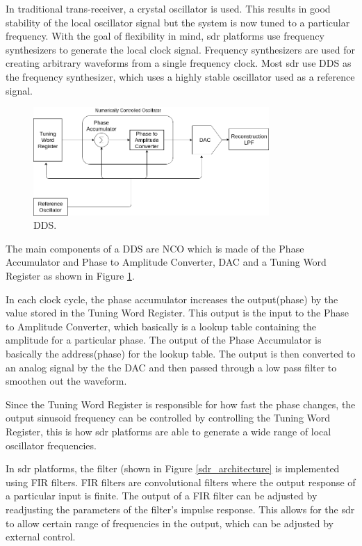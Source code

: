 \begin{itemize}
In traditional trans-receiver, a crystal oscillator is used.
This results in good stability of the local oscillator signal but the system is now tuned to a particular frequency.
With the goal of flexibility in mind, \ac{sdr} platforms use frequency synthesizers to generate the local clock signal.
Frequency synthesizers are used for creating arbitrary waveforms from a single frequency clock.
Most \ac{sdr} use \ac{DDS} as the frequency synthesizer, which uses a highly stable oscillator used as a reference signal.



\begin{figure}[h!]
\centering
\includegraphics[width=0.8\textwidth]{Figure/DDS.png}
\caption{\ac{DDS}.}
\label{dds}
\end{figure}

The main components of a \ac{DDS} are \ac{NCO} which is made of the Phase Accumulator and Phase to Amplitude Converter, \ac{DAC} and a Tuning Word Register as shown in Figure \ref{dds}.

In each clock cycle, the phase accumulator increases the output(phase) by the value stored in the Tuning Word Register.
This output is the input to the Phase to Amplitude Converter, which basically is a lookup table containing the amplitude for a particular phase.
The output of the Phase Accumulator is basically the address(phase) for the lookup table.
The output is then converted to an analog signal by the the \ac{DAC} and then passed through a low pass filter to smoothen out the waveform.

Since the Tuning Word Register is responsible for how fast the phase changes, the output sinusoid frequency can be controlled by controlling the Tuning Word Register, this is how \ac{sdr} platforms are able to generate a wide range of local oscillator frequencies.

In \ac{sdr} platforms, the filter (shown in Figure \ref{sdr_architecture} is implemented using \ac{FIR} filters.
\ac{FIR} filters are convolutional filters where the output response of a particular input is finite.
The output of a \ac{FIR} filter can be adjusted by readjusting the parameters of the filter's impulse response.
This allows for the \ac{sdr} to allow certain range of frequencies in the output, which can be adjusted by external control.


\end{itemize}
